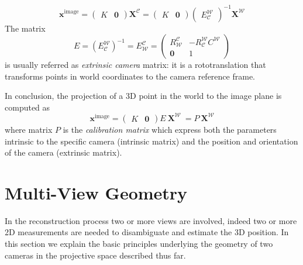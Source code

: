 \begin{equation}
 \mathbf{x}^{\text{image}} =
\begin{pmatrix}
 K &\mathbf{0}
 \end{pmatrix} 
 \mathbf{X}^\mathcal{C}
 = 
\begin{pmatrix}
 K &\mathbf{0}
 \end{pmatrix} 
\begin{pmatrix}
 E_\mathcal{C}^\mathcal{W}
 \end{pmatrix}^{-1}
 \mathbf{X}^\mathcal{W}
\end{equation}
The matrix 
\begin{equation}
  E = (E_\mathcal{C}^\mathcal{W})^{-1} = E_{\mathcal{W}}^{\mathcal{C}} = 
\begin{pmatrix}
R_\mathcal{W}^\mathcal{C} & - R_\mathcal{C}^\mathcal{W} C^\mathcal{W}\\
\mathbf{0}&1
 \end{pmatrix}
\end{equation}
is usually referred as \emph{extrinsic camera} matrix: it is a rototranslation that transforms points in world coordinates to the camera reference frame.

In conclusion, the projection of a 3D point in the world to the image plane is computed as
\begin{equation}
 \mathbf{x}^{\text{image}}
 = 
\begin{pmatrix}
 K &\mathbf{0}
 \end{pmatrix} 
E
\:
 \mathbf{X}^\mathcal{W}\:=
P
\:
 \mathbf{X}^\mathcal{W}
\end{equation}
where matrix $P$ is the \emph{calibration matrix} which express both the parameters intrinsic to the specific camera (intrinsic matrix) and the position and orientation of the camera (extrinsic matrix).


\section{Multi-View Geometry}
In the reconstruction process two or more views are involved, indeed two or more 2D measurements are needed to disambiguate and estimate the 3D position. 
In this section we explain the basic principles underlying the geometry of two cameras in the projective space described thus far.
